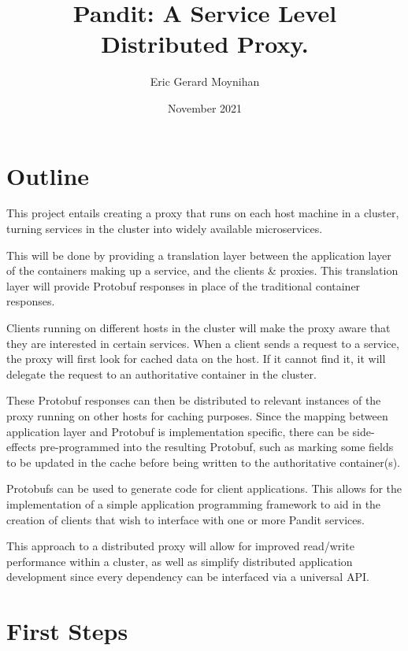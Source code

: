 \documentclass[12pt]{article}
\title{Pandit: A Service Level Distributed Proxy.}
\author{Eric Gerard Moynihan}
\date{November 2021}
\begin{document}
\maketitle
\thispagestyle{empty}

\section*{Outline}
This project entails creating a proxy that runs on each host machine in a cluster, turning services in the cluster into widely available microservices. 

This will be done by providing a translation layer between the application layer of the containers making up a service, and the clients \& proxies.
This translation layer will provide Protobuf \cite{protobuf} responses in place of the traditional container responses.

Clients running on different hosts in the cluster will make the proxy aware that they are interested in certain services.
When a client sends a request to a service, the proxy will first look for cached data on the host. 
If it cannot find it, it will delegate the request to an authoritative container in the cluster.

These Protobuf responses can then be distributed to relevant instances of the proxy running on other hosts for caching purposes.
Since the mapping between application layer and Protobuf is implementation specific, there can be side-effects pre-programmed into the resulting Protobuf, such as marking some fields to be updated in the cache before being written to the authoritative container(s).

Protobufs can be used to generate code for client applications. This allows for the implementation
of a simple application programming framework to aid in the creation of clients that wish to interface
with one or more Pandit services.

This approach to a distributed proxy will allow for improved read/write performance within a cluster, as well as simplify distributed application development since every dependency can be interfaced via a universal API.

\section*{First Steps}
\end{document}
